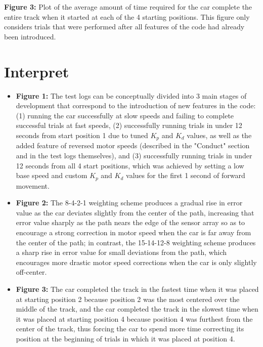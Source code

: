 \documentclass{article}
\begin{document}
\noindent \textbf{Figure 3:} Plot of the average amount of time required for the car complete the entire track when it started at each of the 4 starting positions. This figure only considers trials that were performed after all features of the code had already been introduced.


\section{Interpret}

\begin{itemize}
    \item \textbf{Figure 1:} The test logs can be conceptually divided into 3 main stages of development that correspond to the introduction of new features in the code: (1) running the car successfully at slow speeds and failing to complete successful trials at fast speeds, (2) successfully running trials in under 12 seconds from start position 1 due to tuned \(K_p\) and \(K_d\) values, as well as the added feature of reversed motor speeds (described in the "Conduct" section and in the test logs themselves), and (3) successfully running trials in under 12 seconds from all 4 start positions, which was achieved by setting a low base speed and custom \(K_p\) and \(K_d\) values for the first 1 second of forward movement.
    
    \item \textbf{Figure 2:} The 8-4-2-1 weighting scheme produces a gradual rise in error value as the car deviates slightly from the center of the path, increasing that error value sharply as the path nears the edge of the sensor array so as to encourage a strong correction in motor speed when the car is far away from the center of the path; in contrast, the 15-14-12-8 weighting scheme produces a sharp rise in error value for small deviations from the path, which encourages more drastic motor speed corrections when the car is only slightly off-center.
    
    \item \textbf{Figure 3:} The car completed the track in the fastest time when it was placed at starting position 2 because position 2 was the most centered over the middle of the track, and the car completed the track in the slowest time when it was placed at starting position 4 because position 4 was furthest from the center of the track, thus forcing the car to spend more time correcting its position at the beginning of trials in which it was placed at position 4.
    
\end{itemize}
\end{document}
